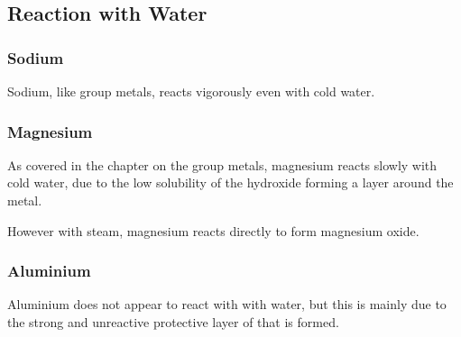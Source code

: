 

		\pagebreak
		\subsection{Reaction with Water}

			\subsubsection{Sodium}

				Sodium, like group  metals, reacts vigorously even with cold water.



			\subsubsection{Magnesium}

				As covered in the chapter on the group  metals, magnesium reacts slowly with cold water, due to the
				low solubility of the hydroxide forming a layer around the metal.


				However with steam, magnesium reacts directly to form magnesium oxide.



			\subsubsection{Aluminium}

				Aluminium does not appear to react with with water, but this is mainly due to the strong and unreactive protective layer of
				 that is formed.


